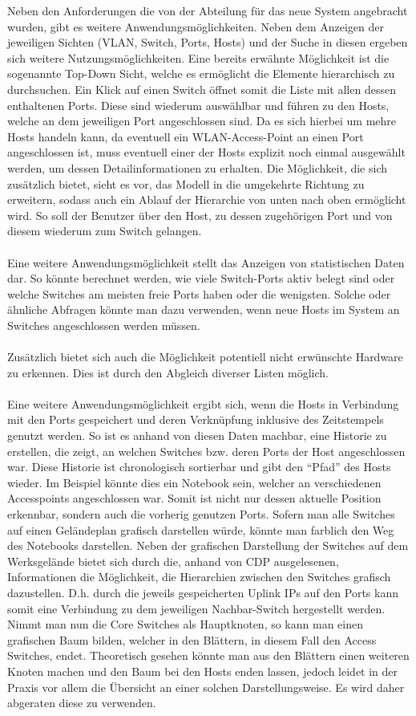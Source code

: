 Neben den Anforderungen die von der Abteilung für das neue System angebracht wurden, gibt es weitere Anwendungsmöglichkeiten. Neben dem Anzeigen der jeweiligen Sichten (VLAN, Switch, Ports, Hosts) und der Suche in diesen ergeben sich weitere Nutzungsmöglichkeiten. Eine bereits erwähnte Möglichkeit ist die sogenannte Top-Down Sicht, welche es ermöglicht die Elemente hierarchisch zu durchsuchen. Ein Klick auf einen Switch öffnet somit die Liste mit allen dessen enthaltenen Ports. Diese sind wiederum auswählbar und führen zu den Hosts, welche an dem jeweiligen Port angeschlossen sind.
Da es sich hierbei um mehre Hosts handeln kann, da eventuell ein WLAN-Access-Point an einen Port angeschlossen ist, muss eventuell einer der Hosts explizit noch einmal ausgewählt werden, um dessen Detailinformationen zu erhalten.
Die Möglichkeit, die sich zusätzlich bietet, sieht es vor, das Modell in die umgekehrte Richtung zu erweitern, sodass auch ein Ablauf der Hierarchie von unten nach oben ermöglicht wird.
So soll der Benutzer über den Host, zu dessen zugehörigen Port und von diesem wiederum zum Switch gelangen.\\\\
Eine weitere Anwendungsmöglichkeit stellt das Anzeigen von statistischen Daten dar.
So könnte berechnet werden, wie viele Switch-Ports aktiv belegt sind oder welche Switches am meisten freie Ports haben oder die wenigsten. Solche oder ähnliche Abfragen könnte man dazu verwenden, wenn neue Hosts im System an Switches angeschlossen werden müssen.\\\\
Zusätzlich bietet sich auch die Möglichkeit potentiell nicht erwünschte Hardware zu erkennen.
Dies ist durch den Abgleich diverser Listen möglich.\\\\
Eine weitere Anwendungsmöglichkeit ergibt sich, wenn die Hosts in Verbindung mit den Ports gespeichert und deren Verknüpfung inklusive des Zeitstempels genutzt werden.
So ist es anhand von diesen Daten machbar, eine Historie zu erstellen, die zeigt, an welchen Switches bzw. deren Ports der Host angeschlossen war. Diese Historie ist chronologisch sortierbar und gibt den “Pfad” des Hosts wieder. Im Beispiel könnte dies ein Notebook sein, welcher an verschiedenen Accesspoints angeschlossen war.
Somit ist nicht nur dessen aktuelle Position erkennbar, sondern auch die vorherig genutzen Ports.
Sofern man alle Switches auf einen Geländeplan grafisch darstellen würde, könnte man farblich den Weg des Notebooks darstellen.
Neben der grafischen Darstellung der Switches auf dem Werksgelände bietet sich durch die, anhand von CDP ausgelesenen, Informationen die Möglichkeit, die Hierarchien zwischen den Switches grafisch dazustellen. D.h. durch die jeweils gespeicherten Uplink IPs auf den Ports kann somit eine Verbindung zu dem jeweiligen Nachbar-Switch hergestellt werden.
Nimmt man nun die Core Switches als Hauptknoten, so kann man einen grafischen Baum bilden, welcher in den Blättern, in diesem Fall den Access Switches, endet.
Theoretisch gesehen könnte man aus den Blättern einen weiteren Knoten machen und den Baum bei den Hosts enden lassen, jedoch leidet in der Praxis vor allem die Übersicht an einer solchen Darstellungsweise. Es wird daher abgeraten diese zu verwenden.

